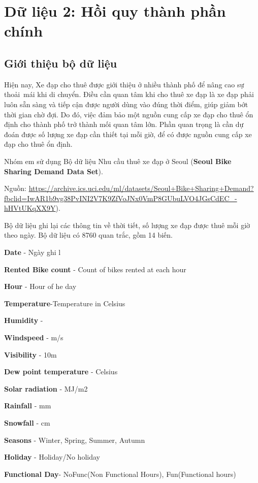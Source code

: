 \section{Dữ liệu 2: Hồi quy thành phần chính}

\subsection{Giới thiệu bộ dữ liệu}
Hiện nay, Xe đạp cho thuê được giới thiệu ở nhiều thành phố để nâng cao sự thoải~mái khi di chuyển. Điều cần quan tâm khi cho thuê xe đạp là xe đạp phải luôn sẵn sàng và tiếp cận được người dùng vào đúng thời điểm, giúp giảm bớt thời gian chờ đợi. Do đó, việc đảm bảo  một nguồn cung cấp xe đạp cho thuê ổn định cho thành phố trở thành mối quan tâm lớn. Phần quan trọng là cần dự đoán được số lượng xe đạp cần thiết tại mỗi giờ, để có được nguồn cung cấp xe đạp cho thuê ổn định.

Nhóm em sử dụng Bộ dữ liệu Nhu cầu thuê xe đạp ở Seoul (\textbf{Seoul Bike Sharing Demand Data Set}).

Nguồn: \url{https://archive.ics.uci.edu/ml/datasets/Seoul+Bike+Sharing+Demand?fbclid=IwAR1b9vg38PvINI2V7K9ZfVoJNx0VmP8GUbuLVO4JGsCdEC\_-hHVtUKqXX9Y}).

Bộ dữ liệu ghi lại các thông tin về thời tiết, số lượng xe đạp được thuê mỗi giờ theo ngày. Bộ dữ liệu có 8760 quan trắc, gồm 14 biến.

\textbf{Date} - Ngày ghi l

\textbf{Rented Bike count} - Count of bikes rented at each hour

\textbf{Hour} - Hour of he day

\textbf{Temperature}-Temperature in Celsius

\textbf{Humidity} - %

\textbf{Windspeed} - m/s

\textbf{Visibility} - 10m

\textbf{Dew point temperature} - Celsius

\textbf{Solar radiation} - MJ/m2

\textbf{Rainfall} - mm

\textbf{Snowfall} - cm

\textbf{Seasons} - Winter, Spring, Summer, Autumn

\textbf{Holiday} - Holiday/No holiday

\textbf{Functional Day}- NoFunc(Non Functional Hours), Fun(Functional hours)


